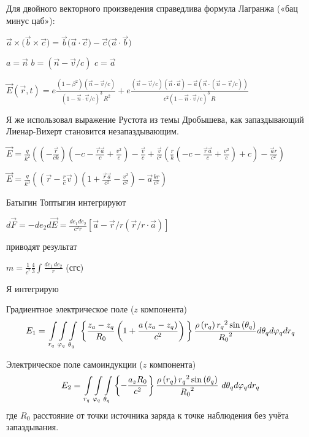 \documentclass{article}
\begin{document}
Для двойного векторного произведения справедлива формула Лагранжа  («бац минус цаб»):

${\vec {a}}\times \big({\vec {b}}\times {\vec {c}}\big ) = {\vec {b}} \big( {\vec {a}} \cdot {\vec {c}}\big) - {\vec {c}} \big( {\vec {a}} \cdot {\vec {b}}\big)$

$a = \vec{n}$ $b =  \left( \vec{n}-\vec{v}/c\right)$ $c =  \vec{a}$


$\vec{E}\left(\vec{r},t\right) = e \frac{\left(1-\beta^2\right) \left(\vec{n}-\vec{v}/c \right)}{\left(1-\vec{n}\cdot\vec{v}/c\right)^3\,R^2} +  e \frac{ \left( \vec{n}-\vec{v}/c\right) \left( \vec{n} \cdot \vec{a} \right) - \vec{a} \left( \vec{n} \cdot \left( \vec{n}-\vec{v}/c\right)\right)}{c^2 \left(1-\vec{n} \cdot \vec{v}/c \right)^3 \,R }$


Я же использовал выражение Рустота из темы Дробышева, как запаздывающий Лиенар-Вихерт становится незапаздывающим.

$\vec{E} = \frac{q}{k^2}((-\frac{\vec{r}}{c k})(-c - \frac{\vec{r}\vec{a}}{c} + \frac{v^2}{c})-\frac{\vec{v}}{c}+\frac{\vec{v}}{c^2}(\frac{r}{k}(-c - \frac{\vec{r}\vec{a}}{c} + \frac{v^2}{c}) + c) - \frac{\vec{a}r}{c^2})$

$\vec{E} = \frac{q}{k^3}((\vec{r}-\frac{r}{c}\vec{v})(1 + \frac{\vec{r}\vec{a}}{c^2} - \frac{v^2}{c^2}) - \vec{a}\frac{kr}{c^2})$


Батыгин Топтыгин интегрируют

$d\vec{F} = - d e_2 d\vec{E} = \frac{de_1 de_2}{c^2 r} \left[ \vec{a} - \vec{r}/r\left( \vec{r}/r \cdot \vec{a}\right) \right]$


 приводят результат 



$m =\frac{1}{{{c}^{^{2}}}}\frac{4}{3}\int\frac{de_1\,de_2}{r}$ (сгс)

Я интегрирую

Градиентное электрическое поле ($z$ компонента)
	\[{E}_{1}=\\
\int\limits_{{{r}_{q}}}\int\limits_{{{\varphi}_{q}}}\int\limits_{{{\theta}_{q}}}\\
\left\{ \frac{z_a-z_q}{{{R}_{0}}}\left( 1+\frac{a\left( {{z}_{a}}-{{z}_{q}} \right)}{c^2} \right) \\
 \right\}\\
\frac{\rho \left( {{r}_{q}} \right){{r}_{q}}^{2}\sin \left( {{\theta }_{q}} \right)}{{{R}_{0}}^{2}}\\
d{{\theta }_{q}}d{{\varphi }_{q}}d{{r}_{q}}\] 	

Электрическое поле самоиндукции ($z$ компонента)
\[{E}_{2}=\\
\int\limits_{{{r}_{q}}}\int\limits_{{{\varphi}_{q}}}\int\limits_{{{\theta}_{q}}}\\
{\left\{ -\frac{{a_z}R_{0}}{{{c}^{2}}} \right\}\\
\frac{\rho \left( {{r}_{q}} \right){{r}_{q}}^{2}\sin \left( {{\theta }_{q}} \right)}{{{R}_{0}}^{2}}\ }d{{\theta }_{q}}d{{\varphi }_{q}}d{{r}_{q}}\]
где ${R}_{0}$ расстояние от точки источника заряда к точке наблюдения без учёта запаздывания.
\end{document}
